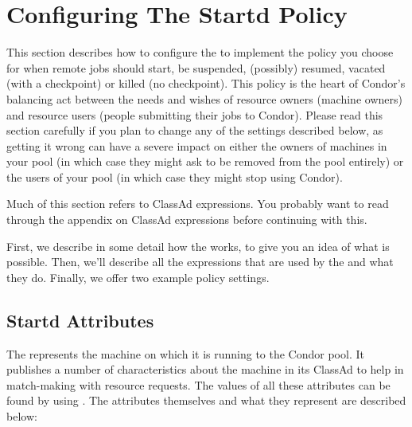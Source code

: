 \section{Configuring The Startd Policy}
\label{sec:Configuring-Policy}

This section describes how to configure the  to
implement the policy you choose for when remote jobs should start, be
suspended, (possibly) resumed, vacated (with a checkpoint) or killed
(no checkpoint).  This policy is the heart of Condor's balancing act
between the needs and wishes of resource owners (machine owners) and
resource users (people submitting their jobs to Condor).  Please read
this section carefully if you plan to change any of the settings
described below, as getting it wrong can have a severe impact on
either the owners of machines in your pool (in which case they might
ask to be removed from the pool entirely) or the users of your pool
(in which case they might stop using Condor).  

Much of this section refers to ClassAd expressions.  You probably want
to read through the appendix on ClassAd expressions before continuing
with this. 

First, we describe in some detail how the  works, to
give you an idea of what is possible.  Then, we'll describe all the
expressions that are used by the  and what they do.
Finally, we offer two example policy settings.

\subsection{Startd Attributes}
\label{sec:Startd-Attributes}

The  represents the machine on which it is running to
the Condor pool.  It publishes a number of characteristics about the
machine in its ClassAd to help in match-making with resource requests.
The values of all these attributes can be found by using
.  The attributes themselves and
what they represent are described below:



